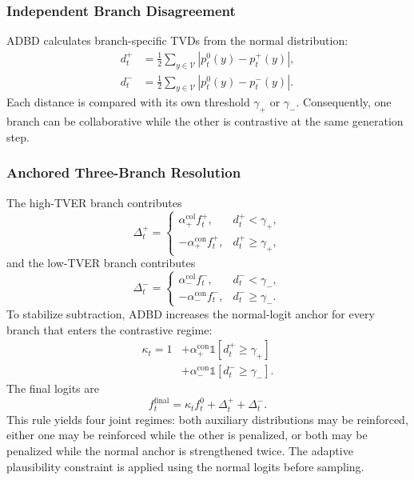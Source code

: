 \subsubsection{Independent Branch Disagreement}

ADBD calculates branch-specific TVDs from the normal distribution:
\begin{align}
d_t^{+}
&=\frac{1}{2}\sum_{y\in\mathcal{V}}
\left|p_t^{0}(y)-p_t^{+}(y)\right|,\\
d_t^{-}
&=\frac{1}{2}\sum_{y\in\mathcal{V}}
\left|p_t^{0}(y)-p_t^{-}(y)\right|.
\end{align}
Each distance is compared with its own threshold $\gamma_{+}$ or $\gamma_{-}$. Consequently, one branch can be collaborative while the other is contrastive at the same generation step.

\subsubsection{Anchored Three-Branch Resolution}

The high-TVER branch contributes
\begin{equation}
\Delta_t^{+}
=
\begin{cases}
\alpha_{+}^{\mathrm{col}}f_t^{+},
    & d_t^{+}<\gamma_{+},\\
-\alpha_{+}^{\mathrm{con}}f_t^{+},
    & d_t^{+}\geq\gamma_{+},
\end{cases}
\end{equation}
and the low-TVER branch contributes
\begin{equation}
\Delta_t^{-}
=
\begin{cases}
\alpha_{-}^{\mathrm{col}}f_t^{-},
    & d_t^{-}<\gamma_{-},\\
-\alpha_{-}^{\mathrm{con}}f_t^{-},
    & d_t^{-}\geq\gamma_{-}.
\end{cases}
\end{equation}
To stabilize subtraction, ADBD increases the normal-logit anchor for every branch that enters the contrastive regime:
\begin{equation}
\begin{split}
\kappa_t=1
&+\alpha_{+}^{\mathrm{con}}
 \mathbb{1}[d_t^{+}\geq\gamma_{+}]\\
&+\alpha_{-}^{\mathrm{con}}
 \mathbb{1}[d_t^{-}\geq\gamma_{-}].
\end{split}
\end{equation}
The final logits are
\begin{equation}
f_t^{\mathrm{final}}
=
\kappa_t f_t^{0}
+\Delta_t^{+}
+\Delta_t^{-}.
\label{eq:final_logits}
\end{equation}
This rule yields four joint regimes: both auxiliary distributions may be reinforced, either one may be reinforced while the other is penalized, or both may be penalized while the normal anchor is strengthened twice. The adaptive plausibility constraint is applied using the normal logits before sampling.

